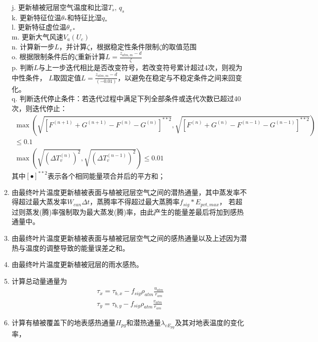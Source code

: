 \begin{enumerate}
    j. 更新植被冠层空气温度和比湿$T_s$, $q_s$ \\ 
    k. 更新特征位温$\theta_\ast$和特征比湿$q_\ast$ \\
    l. 更新特征虚位温$\theta_{v\ast}$ \\
    m. 更新大气风速$V_a\left(U_c\right)$ \\
    n. 计算新一步$L$，并计算$\zeta$，根据稳定性条件限制$\zeta$的取值范围 \\
    o. 根据限制条件后的$\zeta$重新计算$L=\frac{z_{atm,m}-d}{\zeta}$ \\
    p. 判断$L$与上一步迭代相比是否改变符号，若改变符号累计超过4次，则视为中性条件，
    $L$取固定值$L=\frac{z_{atm,m}-d}{\left(-0.01\right)}$，以避免在稳定与不稳定条件之间来回变化。\\
    q. 判断迭代停止条件：若迭代过程中满足下列全部条件或迭代次数已超过40次，则迭代停止：
    \begin{equation}
        \begin{array}{c}\max\left( \sqrt{\left[F^{(n+1)}+G^{(n+1)}-F^{(n)}-G^{(n)}\right]^{\ast\ast2}}, \sqrt{\left[F^{(n)}+G^{(n)}-F^{(n-1)}-G^{(n-1)}\right]^{\ast\ast2}} \right) \\ \leq 0.1 \\ 
        \max\left( \sqrt{\left(\Delta T_{v}^{(n)}\right)^{2}}, \sqrt{\left(\Delta T_{v}^{(n-1)}\right)^{2}} \right) \leq 0.01\end{array}
    \end{equation}
    其中$\left[\bullet\right]^{\ast\ast2}$表示各个相同能量项合并后的平方和；
    \item 由最终叶片温度更新植被表面与植被冠层空气之间的潜热通量，其中蒸发率不得超过最大蒸发率$W_{can} \Delta t$，蒸腾率不得超过最大蒸腾率$f_{sig}\ast E_{pvt,max}$，
    若超过则蒸发(腾)率强制取为最大蒸发(腾)率，由此产生的能量差最后将加到感热通量中。
    \item 由最终叶片温度更新植被表面与植被冠层空气之间的感热通量以及上述因为潜热与温度的调整导致的能量误差之和。
    \item 由最终叶片温度更新植被冠层的雨水感热。
    \item 计算总动量通量为
    \begin{equation}
    \begin{array}{c}\tau_{x}=\tau_{b,x}-f_{sig} \rho_{atm} \frac{u_{atm}}{r_{a m}} \\ 
        \tau_{y}=\tau_{b,y}-f_{sig} \rho_{atm} \frac{v_{atm}}{r_{am}}\end{array}
    \end{equation}
    \item 计算有植被覆盖下的地表感热通量$H_{pg}$和潜热通量$\lambda_{vE_{pg}}$及其对地表温度的变化率，

\end{enumerate}
